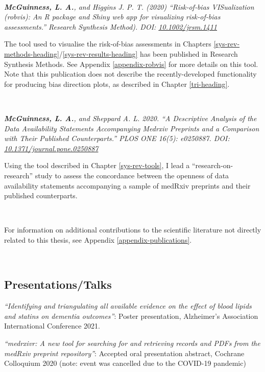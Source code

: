 \documentclass[a4paper, twoside]{templates/ociamthesis}
\begin{document}
~

\emph{\textbf{McGuinness, L. A.}, and Higgins J. P. T. (2020) ``Risk‐of‐bias VISualization (robvis): An R package and Shiny web app for visualizing risk‐of‐bias assessments.'' Research Synthesis Method). DOI: \href{https://doi.org/10.1002/jrsm.1411}{10.1002/jrsm.1411}}

The tool used to visualise the risk-of-bias assessments in Chapters \ref{sys-rev-methods-heading}/\ref{sys-rev-results-heading} has been published in Research Synthesis Methods. See Appendix \ref{appendix-robvis} for more details on this tool. Note that this publication does not describe the recently-developed functionality for producing bias direction plots, as described in Chapter \ref{tri-heading}.

~

\emph{\textbf{McGuinness, L. A.}, and Sheppard A. L. 2020. ``A Descriptive Analysis of the Data Availability Statements Accompanying Medrxiv Preprints and a Comparison with Their Published Counterparts.'' PLOS ONE 16(5): e0250887. DOI: \href{https://doi.org/10.1371/journal.pone.0250887}{10.1371/journal.pone.0250887}}

Using the tool described in Chapter \ref{sys-rev-tools}, I lead a ``research-on-research'' study to assess the concordance between the openness of data availability statements accompanying a sample of medRxiv preprints and their published counterparts.

~

For information on additional contributions to the scientific literature not directly related to this thesis, see Appendix \ref{appendix-publications}.

~

\hypertarget{presentationstalks}{%
\subsection{Presentations/Talks}\label{presentationstalks}}

\emph{``Identifying and triangulating all available evidence on the effect of blood lipids and statins on dementia outcomes''}: Poster presentation, Alzheimer's Association International Conference 2021.
~

\emph{``medrxivr: A new tool for searching for and retrieving records and PDFs from the medRxiv preprint repository''}: Accepted oral presentation abstract, Cochrane Colloquium 2020 (note: event was cancelled due to the COVID-19 pandemic)

~
\end{document}
